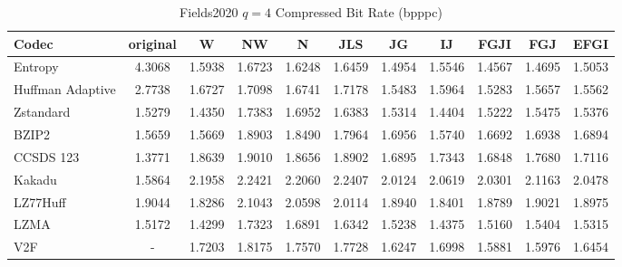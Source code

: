 \documentclass{article}
\begin{document}
\begin{table}[h!]
\centering
\caption{Fields2020 $q=4$ Compressed Bit Rate (bpppc)}
\begin{tabular}{|l|cccccccccc|}
\hline
Codec &  original &      W &     NW &      N &    JLS &     JG &     IJ &   FGJI &    FGJ &   EFGI \\
\hline
Entropy & 4.3068 & 1.5938 & 1.6723 & 1.6248 & 1.6459 & 1.4954 & 1.5546 & 1.4567 & 1.4695 & 1.5053 \\
\hline
Huffman Adaptive &    2.7738 & 1.6727 & 1.7098 & 1.6741 & 1.7178 & 1.5483 & 1.5964 & 1.5283 & 1.5657 & 1.5562 \\
Zstandard        &    1.5279 & 1.4350 & 1.7383 & 1.6952 & 1.6383 & 1.5314 & 1.4404 & 1.5222 & 1.5475 & 1.5376 \\
BZIP2            &    1.5659 & 1.5669 & 1.8903 & 1.8490 & 1.7964 & 1.6956 & 1.5740 & 1.6692 & 1.6938 & 1.6894 \\
CCSDS 123        &    1.3771 & 1.8639 & 1.9010 & 1.8656 & 1.8902 & 1.6895 & 1.7343 & 1.6848 & 1.7680 & 1.7116 \\
Kakadu           &    1.5864 & 2.1958 & 2.2421 & 2.2060 & 2.2407 & 2.0124 & 2.0619 & 2.0301 & 2.1163 & 2.0478 \\
LZ77Huff         &    1.9044 & 1.8286 & 2.1043 & 2.0598 & 2.0114 & 1.8940 & 1.8401 & 1.8789 & 1.9021 & 1.8975 \\
LZMA             &    1.5172 & 1.4299 & 1.7323 & 1.6891 & 1.6342 & 1.5238 & 1.4375 & 1.5160 & 1.5404 & 1.5315 \\
V2F              &   - & 1.7203 & 1.8175 & 1.7570 & 1.7728 & 1.6247 & 1.6998 & 1.5881 & 1.5976 & 1.6454 \\
\hline
\end{tabular}
\end{table}
\end{document}
